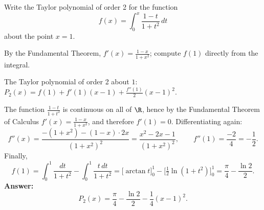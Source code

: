 
\begin{question}
Write the Taylor polynomial of order 2 for the function
\[ f(x)=\int_0^x\frac{1-t}{1+t^2}\,dt \]
about the point $x=1$.
\end{question}

\begin{hint}
By the Fundamental Theorem, $f'(x)=\frac{1-x}{1+x^2}$; compute $f(1)$ directly from the integral.
\end{hint}

\begin{solution}
The Taylor polynomial of order 2 about $1$: $P_2(x)=f(1)+f'(1)(x-1)+\frac{f''(1)}{2}(x-1)^2$.

The function $\frac{1-t}{1+t^2}$ is continuous on all of $\R$, hence by the Fundamental Theorem of Calculus $f'(x)=\frac{1-x}{1+x^2}$, and therefore $f'(1)=0$. Differentiating again:
\[ f''(x)=\frac{-(1+x^2)-(1-x)\cdot2x}{(1+x^2)^2}=\frac{x^2-2x-1}{(1+x^2)^2},\qquad f''(1)=\frac{-2}{4}=-\frac12. \]
Finally,
\[ f(1)=\int_0^1\frac{dt}{1+t^2}-\int_0^1\frac{t\,dt}{1+t^2}=\Big[\arctan t\Big]_0^1-\Big[\tfrac12\ln(1+t^2)\Big]_0^1=\frac\pi4-\frac{\ln2}{2}. \]
\textbf{Answer:}
\[ P_2(x)=\frac\pi4-\frac{\ln2}{2}-\frac14(x-1)^2. \]
\end{solution}
